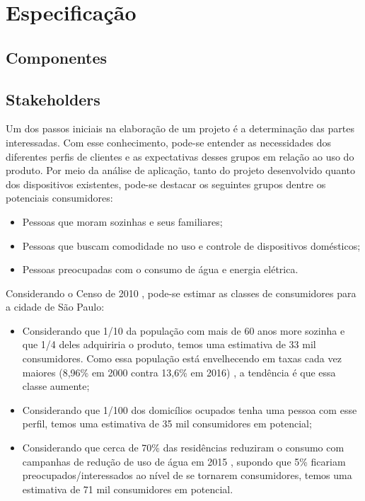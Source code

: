 \chapter{Especificação}

\section{Componentes}

\section{Stakeholders}
Um dos passos iniciais na elaboração de um projeto é a determinação das partes interessadas. Com esse conhecimento, pode-se entender as necessidades dos diferentes perfis de clientes e as expectativas desses grupos em relação ao uso do produto. Por meio da análise de aplicação, tanto do projeto desenvolvido quanto dos dispositivos existentes, pode-se destacar os seguintes grupos dentre os potenciais consumidores:

\begin{itemize}
\item Pessoas que moram sozinhas e seus familiares;
\item Pessoas que buscam comodidade no uso e controle de dispositivos domésticos;
\item Pessoas preocupadas com o consumo de água e energia elétrica.
\end{itemize}

Considerando o Censo de 2010 \cite{ibge}, pode-se estimar as classes de consumidores para a cidade de São Paulo:

\begin{itemize}
\item Considerando que 1/10 da população com mais de 60 anos more sozinha e que 1/4 deles adquiriria o produto, temos uma estimativa de 33 mil consumidores. Como essa população está envelhecendo em taxas cada vez maiores (8,96\% em 2000 contra 13,6\% em 2016) \cite{bibliotecaVirtual}, a tendência é que essa classe aumente;
\item Considerando que 1/100 dos domicílios ocupados tenha uma pessoa com esse perfil, temos uma estimativa de 35 mil consumidores em potencial;
\item Considerando que cerca de 70\% das residências reduziram o consumo com campanhas de redução de uso de água em 2015 \cite{g1}, supondo que 5\% ficariam preocupados/interessados ao nível de se tornarem consumidores, temos uma estimativa de 71 mil consumidores em potencial.
\end{itemize}

